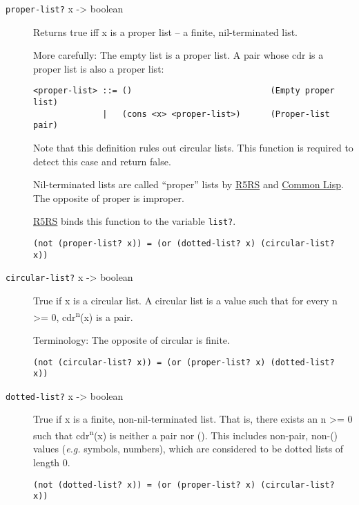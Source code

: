 \begin{description}
\item[ \texttt{proper-list?} x -\textgreater{} boolean \href{}{} ]
Returns true iff x is a proper list -- a finite, nil-terminated list.

More carefully: The empty list is a proper list. A pair whose cdr is a
proper list is also a proper list:

\begin{verbatim}
<proper-list> ::= ()                            (Empty proper list)
              |   (cons <x> <proper-list>)      (Proper-list pair)
\end{verbatim}

Note that this definition rules out circular lists. This function is
required to detect this case and return false.

Nil-terminated lists are called ``proper'' lists by
\protect\hyperlink{R5RS}{R5RS} and \protect\hyperlink{CommonLisp}{Common
Lisp}. The opposite of proper is improper.

\protect\hyperlink{R5RS}{R5RS} binds this function to the variable
\texttt{list?}.

\begin{verbatim}
(not (proper-list? x)) = (or (dotted-list? x) (circular-list? x))
\end{verbatim}

\href{}{}
\item[\texttt{circular-list?} x -\textgreater{} boolean ]
True if x is a circular list. A circular list is a value such that for
every n \textgreater{}= 0, cdr\textsuperscript{n}(x) is a pair.

Terminology: The opposite of circular is finite.

\begin{verbatim}
(not (circular-list? x)) = (or (proper-list? x) (dotted-list? x))
\end{verbatim}

\href{}{}
\item[\texttt{dotted-list?} x -\textgreater{} boolean ]
True if x is a finite, non-nil-terminated list. That is, there exists an
n \textgreater{}= 0 such that cdr\textsuperscript{n}(x) is neither a
pair nor (). This includes non-pair, non-() values (\emph{e.g.} symbols,
numbers), which are considered to be dotted lists of length 0.

\begin{verbatim}
(not (dotted-list? x)) = (or (proper-list? x) (circular-list? x))
\end{verbatim}


\end{description}
